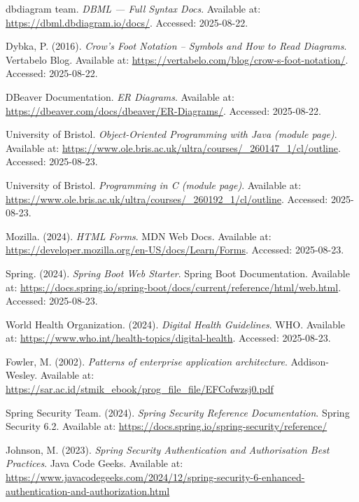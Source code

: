 \begin{thebibliography}{99}
dbdiagram team. \emph{DBML — Full Syntax Docs}. Available at:
\url{https://dbml.dbdiagram.io/docs/}. Accessed: 2025-08-22.

Dybka, P. (2016). \emph{Crow’s Foot Notation – Symbols and How to Read Diagrams}.
Vertabelo Blog. Available at:
\url{https://vertabelo.com/blog/crow-s-foot-notation/}. Accessed: 2025-08-22.

DBeaver Documentation. \emph{ER Diagrams}. Available at:
\url{https://dbeaver.com/docs/dbeaver/ER-Diagrams/}. Accessed: 2025-08-22.

University of Bristol.
\emph{Object-Oriented Programming with Java (module page)}.
Available at: \url{https://www.ole.bris.ac.uk/ultra/courses/_260147_1/cl/outline}.
Accessed: 2025-08-23.

University of Bristol.
\emph{Programming in C (module page)}.
Available at: \url{https://www.ole.bris.ac.uk/ultra/courses/_260192_1/cl/outline}.
Accessed: 2025-08-23.

    Mozilla. (2024). \emph{HTML Forms}. MDN Web Docs.
    Available at: \url{https://developer.mozilla.org/en-US/docs/Learn/Forms}.
    Accessed: 2025-08-23.

    Spring. (2024). \emph{Spring Boot Web Starter}. Spring Boot Documentation.
    Available at: \url{https://docs.spring.io/spring-boot/docs/current/reference/html/web.html}.
    Accessed: 2025-08-23.

    World Health Organization. (2024). \emph{Digital Health Guidelines}. WHO.
    Available at: \url{https://www.who.int/health-topics/digital-health}.
    Accessed: 2025-08-23.

    Fowler, M. (2002). \emph{Patterns of enterprise application architecture}. Addison-Wesley.
    Available at: \url{https://sar.ac.id/stmik_ebook/prog_file_file/EFCofwzsj0.pdf}

    Spring Security Team. (2024). \emph{Spring Security Reference Documentation}. Spring Security 6.2.
    Available at: \url{https://docs.spring.io/spring-security/reference/}

    Johnson, M. (2023). \emph{Spring Security Authentication and Authorisation Best Practices}. Java Code Geeks.
    Available at: \url{https://www.javacodegeeks.com/2024/12/spring-security-6-enhanced-authentication-and-authorization.html}


\end{thebibliography}
